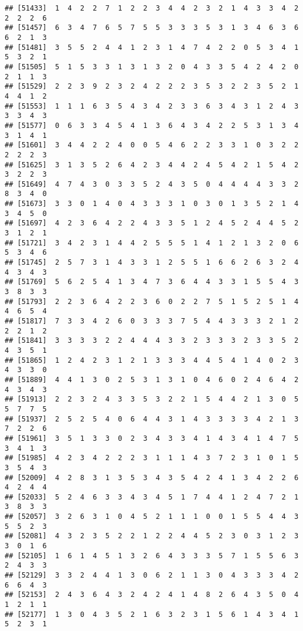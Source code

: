 \documentclass[
]{article}
\begin{document}
\begin{verbatim}
## [51433]  1  4  2  2  7  1  2  2  3  4  4  2  3  2  1  4  3  3  4  2  2  2  2  6
## [51457]  6  3  4  7  6  5  7  5  5  3  3  3  5  3  1  3  4  6  3  6  6  2  1  3
## [51481]  3  5  5  2  4  4  1  2  3  1  4  7  4  2  2  0  5  3  4  1  5  3  2  1
## [51505]  5  1  5  3  3  1  3  1  3  2  0  4  3  3  5  4  2  4  2  0  2  1  1  3
## [51529]  2  2  3  9  2  3  2  4  2  2  2  3  5  3  2  2  3  5  2  1  4  4  1  2
## [51553]  1  1  1  6  3  5  4  3  4  2  3  3  6  3  4  3  1  2  4  3  3  3  4  3
## [51577]  0  6  3  3  4  5  4  1  3  6  4  3  4  2  2  5  3  1  3  4  3  1  4  1
## [51601]  3  4  4  2  2  4  0  0  5  4  6  2  2  3  3  1  0  3  2  2  2  2  2  3
## [51625]  3  1  3  5  2  6  4  2  3  4  4  2  4  5  4  2  1  5  4  2  3  2  2  3
## [51649]  4  7  4  3  0  3  3  5  2  4  3  5  0  4  4  4  4  3  3  2  8  3  4  0
## [51673]  3  3  0  1  4  0  4  3  3  3  1  0  3  0  1  3  5  2  1  4  3  4  5  0
## [51697]  4  2  3  6  4  2  2  4  3  3  5  1  2  4  5  2  4  4  5  2  3  1  2  1
## [51721]  3  4  2  3  1  4  4  2  5  5  5  1  4  1  2  1  3  2  0  6  5  3  4  6
## [51745]  2  5  7  3  1  4  3  3  1  2  5  5  1  6  6  2  6  3  2  4  4  3  4  3
## [51769]  5  6  2  5  4  1  3  4  7  3  6  4  4  3  3  1  5  5  4  3  3  8  3  3
## [51793]  2  2  3  6  4  2  2  3  6  0  2  2  7  5  1  5  2  5  1  4  4  6  5  4
## [51817]  7  3  3  4  2  6  0  3  3  3  7  5  4  4  3  3  3  2  1  2  2  2  1  2
## [51841]  3  3  3  3  2  2  4  4  4  3  3  2  3  3  3  2  3  3  5  2  4  3  5  1
## [51865]  1  2  4  2  3  1  2  1  3  3  3  4  4  5  4  1  4  0  2  3  4  3  3  0
## [51889]  4  4  1  3  0  2  5  3  1  3  1  0  4  6  0  2  4  6  4  2  4  3  4  3
## [51913]  2  2  3  2  4  3  3  5  3  2  2  1  5  4  4  2  1  3  0  5  5  7  7  5
## [51937]  2  5  2  5  4  0  6  4  4  3  1  4  3  3  3  3  4  2  1  3  7  2  2  6
## [51961]  3  5  1  3  3  0  2  3  4  3  3  4  1  4  3  4  1  4  7  5  3  4  1  3
## [51985]  4  2  3  4  2  2  2  3  1  1  1  4  3  7  2  3  1  0  1  5  3  5  4  3
## [52009]  4  2  8  3  1  3  5  3  4  3  5  4  2  4  1  3  4  2  2  6  4  2  4  4
## [52033]  5  2  4  6  3  3  4  3  4  5  1  7  4  4  1  2  4  7  2  1  3  8  3  3
## [52057]  3  2  6  3  1  0  4  5  2  1  1  1  0  0  1  5  5  4  4  3  5  5  2  3
## [52081]  4  3  2  3  5  2  2  1  2  2  4  4  5  2  3  0  3  1  2  3  3  0  1  6
## [52105]  1  6  1  4  5  1  3  2  6  4  3  3  3  5  7  1  5  5  6  3  2  4  3  3
## [52129]  3  3  2  4  4  1  3  0  6  2  1  1  3  0  4  3  3  3  4  2  6  6  4  3
## [52153]  2  4  3  6  4  3  2  4  2  4  1  4  8  2  6  4  3  5  0  4  1  2  1  1
## [52177]  1  3  0  4  3  5  2  1  6  3  2  3  1  5  6  1  4  3  4  1  5  2  3  1

\end{verbatim}
\end{document}
